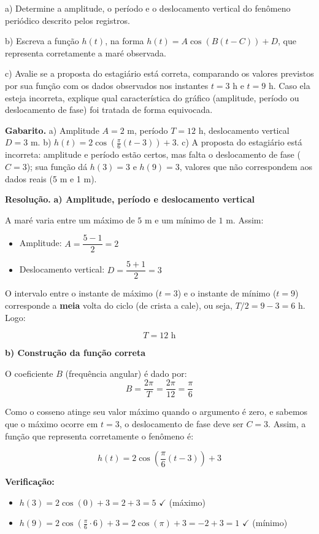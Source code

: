 \documentclass[11pt,a4paper]{article}
\begin{document}
a) Determine a amplitude, o período e o deslocamento vertical do fenômeno periódico descrito pelos registros.

b) Escreva a função $h(t)$, na forma $h(t) = A\cos(B(t-C)) + D$, que representa corretamente a maré observada.

c) Avalie se a proposta do estagiário está correta, comparando os valores previstos por sua função com os dados observados nos instantes $t=3$ h e $t=9$ h. Caso ela esteja incorreta, explique qual característica do gráfico (amplitude, período ou deslocamento de fase) foi tratada de forma equivocada.

\textbf{Gabarito.} a) Amplitude $A=2$ m, período $T=12$ h, deslocamento vertical $D=3$ m. b) $h(t) = 2\cos\left(\frac{\pi}{6}(t-3)\right)+3$. c) A proposta do estagiário está incorreta: amplitude e período estão certos, mas falta o deslocamento de fase ($C=3$); sua função dá $h(3)=3$ e $h(9)=3$, valores que não correspondem aos dados reais (5 m e 1 m).

\textbf{Resolução.} \textbf{a) Amplitude, período e deslocamento vertical}

A maré varia entre um máximo de $5$ m e um mínimo de $1$ m. Assim:

\begin{itemize}[nosep,leftmargin=*]
\item Amplitude: $A = \dfrac{5-1}{2} = 2$
\item Deslocamento vertical: $D = \dfrac{5+1}{2} = 3$
\end{itemize}

O intervalo entre o instante de máximo ($t=3$) e o instante de mínimo ($t=9$) corresponde a \textbf{meia} volta do ciclo (de crista a cale), ou seja, $T/2 = 9-3 = 6$ h. Logo:

$$T = 12 \text{ h}$$

\textbf{b) Construção da função correta}

O coeficiente $B$ (frequência angular) é dado por:
$$B = \frac{2\pi}{T} = \frac{2\pi}{12} = \frac{\pi}{6}$$

Como o cosseno atinge seu valor máximo quando o argumento é zero, e sabemos que o máximo ocorre em $t=3$, o deslocamento de fase deve ser $C = 3$. Assim, a função que representa corretamente o fenômeno é:

$$h(t) = 2\cos\left(\frac{\pi}{6}(t-3)\right) + 3$$

\textbf{Verificação:}
\begin{itemize}[nosep,leftmargin=*]
\item $h(3) = 2\cos(0) + 3 = 2 + 3 = 5$ $\checkmark$ (máximo)
\item $h(9) = 2\cos\left(\frac{\pi}{6}\cdot 6\right) + 3 = 2\cos(\pi) + 3 = -2+3 = 1$ $\checkmark$ (mínimo)
\end{itemize}
\end{document}
